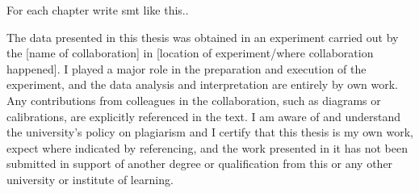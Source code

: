 
For each chapter write smt like this.. 


The data presented in this thesis was obtained in an experiment carried out by the
[name of collaboration] in [location of experiment/where collaboration happened]. I
played a major role in the preparation and execution of the experiment, and the data
analysis and interpretation are entirely by own work. Any contributions from
colleagues in the collaboration, such as diagrams or calibrations, are explicitly
referenced in the text.
I am aware of and understand the university’s policy on plagiarism and I certify that
this thesis is my own work, expect where indicated by referencing, and the work
presented in it has not been submitted in support of another degree or qualification
from this or any other university or institute of learning. 